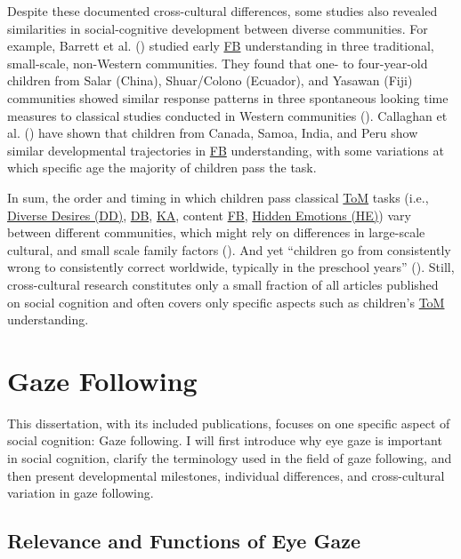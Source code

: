 \documentclass[
]{scrbook}
\begin{document}
Despite these documented cross-cultural differences, some studies also revealed similarities in social-cognitive development between diverse communities. For example, Barrett et al. () studied early \hyperref[acronyms_FB]{FB} understanding in three traditional, small-scale, non-Western communities. They found that one- to four-year-old children from Salar (China), Shuar/Colono (Ecuador), and Yasawan (Fiji) communities showed similar response patterns in three spontaneous looking time measures to classical studies conducted in Western communities (). Callaghan et al. () have shown that children from Canada, Samoa, India, and Peru show similar developmental trajectories in \hyperref[acronyms_FB]{FB} understanding, with some variations at which specific age the majority of children pass the task.

In sum, the order and timing in which children pass classical \hyperref[acronyms_ToM]{ToM} tasks (i.e., \hyperref[acronyms_DD]{Diverse Desires (DD)}, \hyperref[acronyms_DB]{DB}, \hyperref[acronyms_KA]{KA}, content \hyperref[acronyms_FB]{FB}, \hyperref[acronyms_HE]{Hidden Emotions (HE)}) vary between different communities, which might rely on differences in large-scale cultural, and small scale family factors (). And yet ``children go from consistently wrong to consistently correct worldwide, typically in the preschool years'' (). Still, cross-cultural research constitutes only a small fraction of all articles published on social cognition and often covers only specific aspects such as children's \hyperref[acronyms_ToM]{ToM} understanding.

\section{Gaze Following}\label{intro-gaze}

This dissertation, with its included publications, focuses on one specific aspect of social cognition: Gaze following. I will first introduce why eye gaze is important in social cognition, clarify the terminology used in the field of gaze following, and then present developmental milestones, individual differences, and cross-cultural variation in gaze following.

\subsection{Relevance and Functions of Eye Gaze}\label{relevance-and-functions-of-eye-gaze}
\end{document}
